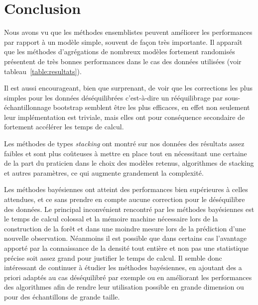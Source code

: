 
\chapter{Conclusion}
\label{chap:conclusion}

Nous avons vu que les méthodes ensemblistes peuvent améliorer les performances par rapport à un modèle simple, souvent de façon très importante. Il apparaît que les méthodes d'agrégations de nombreux modèles fortement randomisés présentent de très bonnes performances dans le cas des données utilisées (voir tableau~\ref{table:resultats}).

Il est aussi encourageant, bien que surprenant, de voir que les corrections les plus simples pour les données déséquilibrées c'est-à-dire un rééquilibrage par sous-échantillonnage bootstrap semblent être les plus efficaces, en effet non seulement leur implémentation est triviale, mais elles ont pour conséquence secondaire de fortement accélérer les temps de calcul.

Les méthodes de types \emph{stacking} ont montré sur nos données des résultats assez faibles et sont plus coûteuses à mettre en place tout en nécessitant une certaine  de la part du praticien dans le choix des modèles retenus, algorithmes de stacking et autres paramètres, ce qui augmente grandement la complexité.

Les méthodes bayésiennes ont atteint des performances bien supérieures à celles attendues, et ce sans prendre en compte aucune correction pour le déséquilibre des données. Le principal inconvénient rencontré par les méthodes bayésiennes est le temps de calcul colossal et la mémoire machine nécessaire lors de la construction de la forêt et dans une moindre mesure lors de la prédiction d'une nouvelle observation. Néanmoins il est possible que dans certains cas l'avantage apporté par la connaissance de la densité tout entière et non pas une statistique précise soit assez grand pour justifier le temps de calcul. Il semble donc intéressant de continuer à étudier les méthodes bayésiennes, en ajoutant des a priori adaptés au cas déséquilibré par exemple ou en améliorant les performances des algorithmes afin de rendre leur utilisation possible en grande dimension ou pour des échantillons de grande taille.

